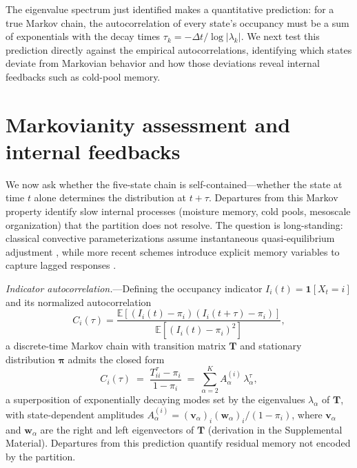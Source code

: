 \documentclass[
    aps,
    prl,
    reprint,
    superscriptaddress,
    amsmath,amssymb,
    floatfix,
    nofootinbib
]{revtex4-2}
\begin{document}
The eigenvalue spectrum just identified makes a quantitative prediction: for a true Markov chain, the autocorrelation of every state's occupancy must be a sum of exponentials with the decay times $\tau_k = -\Delta t / \log|\lambda_k|$. We next test this prediction directly against the empirical autocorrelations, identifying which states deviate from Markovian behavior and how those deviations reveal internal feedbacks such as cold-pool memory.

\section{Markovianity assessment and internal feedbacks}
\label{sec:markov}

We now ask whether the five-state chain is self-contained---whether the state at time $t$ alone determines the distribution at $t+\tau$. Departures from this Markov property identify slow internal processes (moisture memory, cold pools, mesoscale organization) that the partition does not resolve. The question is long-standing: classical convective parameterizations assume instantaneous quasi-equilibrium adjustment \cite{zhang2003convective, bechtold2014representing}, while more recent schemes introduce explicit memory variables to capture lagged responses \cite{piriou2007approach, gerard2009cloud, mapes2011parameterizing, hwong2023assessing}.

\emph{Indicator autocorrelation.}---Defining the occupancy indicator $I_i(t) = \mathbf{1}[X_t = i]$ and its normalized autocorrelation
\begin{equation}
C_i(\tau) =
\frac{\mathbb{E}\!\left[(I_i(t)-\pi_i)(I_i(t+\tau)-\pi_i)\right]}
     {\mathbb{E}\!\left[(I_i(t)-\pi_i)^2\right]},
\end{equation}
a discrete-time Markov chain with transition matrix $\mathbf{T}$ and stationary distribution $\boldsymbol{\pi}$ admits the closed form \cite{souza2024representing}
\begin{equation}
C_i(\tau) \;=\; \frac{T^\tau_{ii} - \pi_i}{1-\pi_i}
\;=\; \sum_{\alpha=2}^K A_\alpha^{(i)}\, \lambda_\alpha^\tau,
\label{eq:autocor}
\end{equation}
a superposition of exponentially decaying modes set by the eigenvalues $\lambda_\alpha$ of $\mathbf{T}$, with state-dependent amplitudes $A_\alpha^{(i)} = (\mathbf{v}_\alpha)_i (\mathbf{w}_\alpha)_i / (1-\pi_i)$, where $\mathbf{v}_\alpha$ and $\mathbf{w}_\alpha$ are the right and left eigenvectors of $\mathbf{T}$ (derivation in the Supplemental Material). Departures from this prediction quantify residual memory not encoded by the partition.
\end{document}
